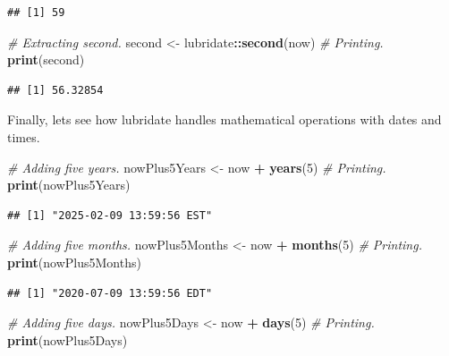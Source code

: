 \documentclass[]{book}
\newenvironment{Shaded}{\begin{snugshade}}{\end{snugshade}}
\newcommand{\CommentTok}[1]{\textcolor[rgb]{0.56,0.35,0.01}{\textit{#1}}}
\newcommand{\DecValTok}[1]{\textcolor[rgb]{0.00,0.00,0.81}{#1}}
\newcommand{\KeywordTok}[1]{\textcolor[rgb]{0.13,0.29,0.53}{\textbf{#1}}}
\newcommand{\NormalTok}[1]{#1}
\newcommand{\OperatorTok}[1]{\textcolor[rgb]{0.81,0.36,0.00}{\textbf{#1}}}
\newcommand{\StringTok}[1]{\textcolor[rgb]{0.31,0.60,0.02}{#1}}
\begin{document}
\begin{verbatim}
## [1] 59
\end{verbatim}

\begin{Shaded}
\begin{Highlighting}[]
\CommentTok{# Extracting second.}
\NormalTok{second <-}\StringTok{ }\NormalTok{lubridate}\OperatorTok{::}\KeywordTok{second}\NormalTok{(now)}
\CommentTok{# Printing.}
\KeywordTok{print}\NormalTok{(second)}
\end{Highlighting}
\end{Shaded}

\begin{verbatim}
## [1] 56.32854
\end{verbatim}

Finally, lets see how lubridate handles mathematical operations with dates and times.

\begin{Shaded}
\begin{Highlighting}[]
\CommentTok{# Adding five years.}
\NormalTok{nowPlus5Years <-}\StringTok{ }\NormalTok{now }\OperatorTok{+}\StringTok{ }\KeywordTok{years}\NormalTok{(}\DecValTok{5}\NormalTok{)}
\CommentTok{# Printing.}
\KeywordTok{print}\NormalTok{(nowPlus5Years)}
\end{Highlighting}
\end{Shaded}

\begin{verbatim}
## [1] "2025-02-09 13:59:56 EST"
\end{verbatim}

\begin{Shaded}
\begin{Highlighting}[]
\CommentTok{# Adding five months.}
\NormalTok{nowPlus5Months <-}\StringTok{ }\NormalTok{now }\OperatorTok{+}\StringTok{ }\KeywordTok{months}\NormalTok{(}\DecValTok{5}\NormalTok{)}
\CommentTok{# Printing.}
\KeywordTok{print}\NormalTok{(nowPlus5Months)}
\end{Highlighting}
\end{Shaded}

\begin{verbatim}
## [1] "2020-07-09 13:59:56 EDT"
\end{verbatim}

\begin{Shaded}
\begin{Highlighting}[]
\CommentTok{# Adding five days.}
\NormalTok{nowPlus5Days <-}\StringTok{ }\NormalTok{now }\OperatorTok{+}\StringTok{ }\KeywordTok{days}\NormalTok{(}\DecValTok{5}\NormalTok{)}
\CommentTok{# Printing.}
\KeywordTok{print}\NormalTok{(nowPlus5Days)}
\end{Highlighting}
\end{Shaded}
\end{document}
